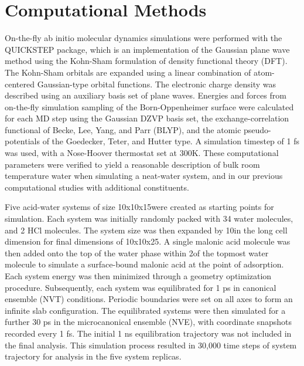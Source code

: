\section {Computational Methods}

On-the-fly ab initio molecular dynamics simulations were performed with the QUICKSTEP package, which is an implementation of the Gaussian plane wave method using the Kohn-Sham formulation of density functional theory (DFT).\cite{VandeVondele2005} The Kohn-Sham orbitals are expanded using a linear combination of atom-centered Gaussian-type orbital functions. The electronic charge density was described using an auxiliary basis set of plane waves. Energies and forces from on-the-fly simulation sampling of the Born-Oppenheimer surface were calculated for each MD step using the Gaussian DZVP basis set, the exchange-correlation functional of Becke, Lee, Yang, and Parr (BLYP),\cite{LEE1988} and the atomic pseudo-potentials of the Goedecker, Teter, and Hutter type.\cite{Goedecker1996} A simulation timestep of 1 fs was used, with a Nose-Hoover thermostat set at 300K. These computational parameters were verified to yield a reasonable description of bulk room temperature water when simulating a neat-water system, and in our previous computational studies with additional constituents.\cite{Shamay2007}

Five acid-water systems of size 10x10x15\angs were created as starting points for simulation. Each system was initially randomly packed with 34 water molecules, and 2 HCl molecules. The system size was then expanded by 10\angs in the long cell dimension for final dimensions of 10x10x25\angs. A single malonic acid molecule was then added onto the top of the water phase within 2\angs of the topmost water molecule to simulate a surface-bound malonic acid at the point of adsorption. Each system energy was then minimized through a geometry optimization procedure. Subsequently, each system was equilibrated for 1 ps in canonical ensemble (NVT) conditions. Periodic boundaries were set on all axes to form an infinite slab configuration. The equilibrated systems were then simulated for a further 30 ps in the microcanonical ensemble (NVE), with coordinate snapshots recorded every 1 fs. The initial 1 ns equilibration trajectory was not included in the final analysis. This simulation process resulted in 30,000 time steps of system trajectory for analysis in the five system replicas.
